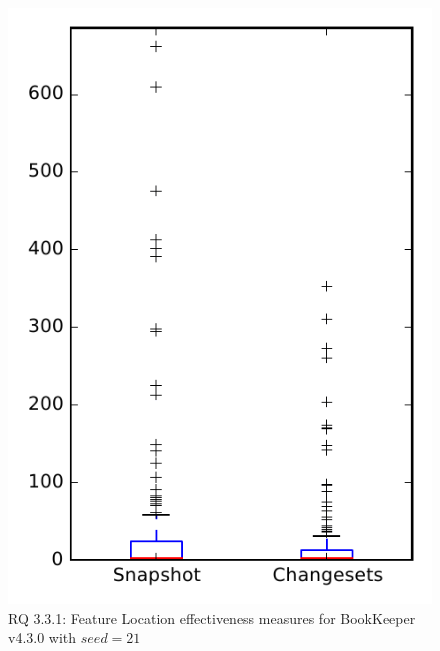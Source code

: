 
\begin{figure}
\centering
\includegraphics[height=0.4\textheight]{figures/flt_seed/rq1_bookkeeper_21}
\caption{RQ 3.3.1: Feature Location effectiveness measures for BookKeeper v4.3.0 with $seed=21$}
\label{fig:flt_seed:rq1:bookkeeper}
\end{figure}

